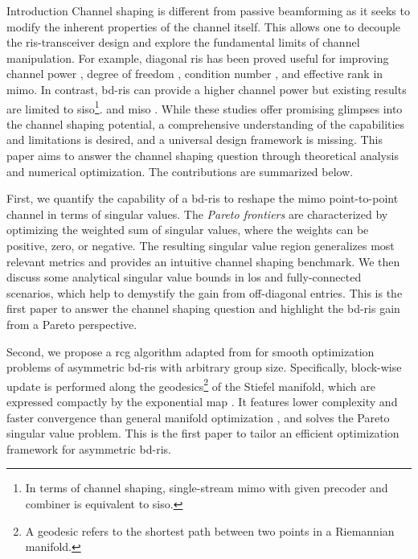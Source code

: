 \documentclass[journal]{IEEEtran}
\begin{document}
\begin{section}{Introduction}
	Channel shaping is different from passive beamforming as it seeks to modify the inherent properties of the channel itself.
	This allows one to decouple the \gls{ris}-transceiver design and explore the fundamental limits of channel manipulation.
	For example, diagonal \gls{ris} has been proved useful for improving channel power \cite{Ning2020}, degree of freedom \cite{Ozdogan2020,Li2023h}, condition number \cite{Zheng2022,Huang2023}, and effective rank \cite{ElMossallamy2021,Meng2023} in \gls{mimo}.
	In contrast, \gls{bd}-\gls{ris} can provide a higher channel power but existing results are limited to \gls{siso}\footnote{In terms of channel shaping, single-stream \gls{mimo} with given precoder and combiner \cite{Nerini2023} is equivalent to \gls{siso}.}. \cite{Nerini2023} and \gls{miso} \cite{Santamaria2023}.
	While these studies offer promising glimpses into the channel shaping potential, a comprehensive understanding of the capabilities and limitations is desired, and a universal design framework is missing.
	This paper aims to answer the channel shaping question through theoretical analysis and numerical optimization.
	The contributions are summarized below.

	First, we quantify the capability of a \gls{bd}-\gls{ris} to reshape the \gls{mimo} point-to-point channel in terms of singular values.
	The \emph{Pareto frontiers} are characterized by optimizing the {weighted sum of singular values}, where the weights can be positive, zero, or negative.
	The resulting singular value region generalizes most relevant metrics and provides an intuitive channel shaping benchmark.
	We then discuss some analytical singular value bounds in \gls{los} and fully-connected scenarios, which help to demystify the gain from off-diagonal entries.
	This is the first paper to answer the channel shaping question and highlight the \gls{bd}-\gls{ris} gain from a Pareto perspective.

	Second, we propose a \gls{rcg} algorithm adapted from \cite{Abrudan2008,Abrudan2009} for smooth optimization problems of asymmetric \gls{bd}-\gls{ris} with arbitrary group size.
	Specifically, block-wise update is performed along the geodesics\footnote{A geodesic refers to the shortest path between two points in a Riemannian manifold.} of the Stiefel manifold, which are expressed compactly by the exponential map \cite{Edelman1998}.
	It features lower complexity and faster convergence than general manifold optimization \cite{Absil2009,Pan2022d}, and solves the Pareto singular value problem.
	This is the first paper to tailor an efficient optimization framework for asymmetric \gls{bd}-\gls{ris}.


\end{section}
\end{document}
